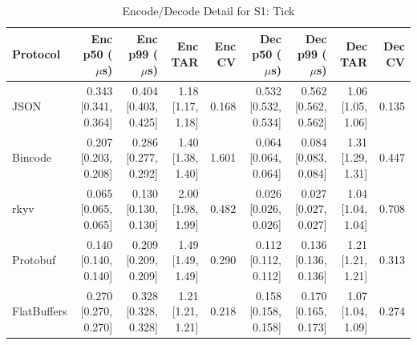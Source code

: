\begin{table}[htbp]
\centering
\caption{Encode/Decode Detail for S1: Tick}
\label{tab:detail_tick}
\begin{tabular}{l r r r r r r r r}
\hline
Protocol & Enc p50 ($\mu$s) & Enc p99 ($\mu$s) & Enc TAR & Enc CV & Dec p50 ($\mu$s) & Dec p99 ($\mu$s) & Dec TAR & Dec CV \\
\hline
  JSON & 0.343 [0.341, 0.364] & 0.404 [0.403, 0.425] & 1.18 [1.17, 1.18] & 0.168 & 0.532 [0.532, 0.534] & 0.562 [0.562, 0.562] & 1.06 [1.05, 1.06] & 0.135 \\
  Bincode & 0.207 [0.203, 0.208] & 0.286 [0.277, 0.292] & 1.40 [1.38, 1.40] & 1.601 & 0.064 [0.064, 0.064] & 0.084 [0.083, 0.084] & 1.31 [1.29, 1.31] & 0.447 \\
  rkyv & 0.065 [0.065, 0.065] & 0.130 [0.130, 0.130] & 2.00 [1.98, 1.99] & 0.482 & 0.026 [0.026, 0.026] & 0.027 [0.027, 0.027] & 1.04 [1.04, 1.04] & 0.708 \\
  Protobuf & 0.140 [0.140, 0.140] & 0.209 [0.209, 0.209] & 1.49 [1.49, 1.49] & 0.290 & 0.112 [0.112, 0.112] & 0.136 [0.136, 0.136] & 1.21 [1.21, 1.21] & 0.313 \\
  FlatBuffers & 0.270 [0.270, 0.270] & 0.328 [0.328, 0.328] & 1.21 [1.21, 1.21] & 0.218 & 0.158 [0.158, 0.158] & 0.170 [0.165, 0.173] & 1.07 [1.04, 1.09] & 0.274 \\
\hline
\end{tabular}
\end{table}